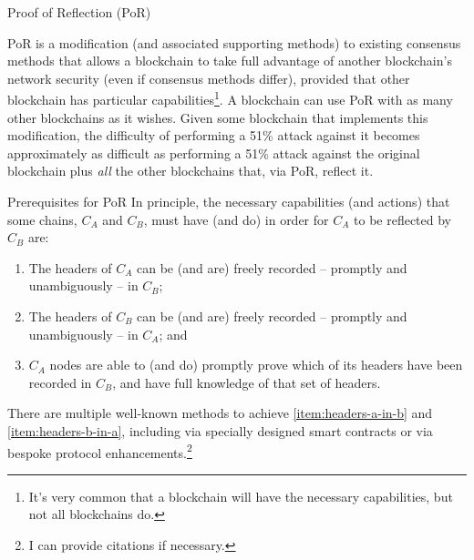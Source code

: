 \documentclass[a4paper,]{article}
\providecommand{\tightlist}{%
  \setlength{\itemsep}{0pt}\setlength{\parskip}{0pt}}
\begin{document}
\begin{section}{Proof of Reflection (PoR)}

    PoR is a modification (and associated supporting methods) to existing consensus methods that allows a blockchain to take full advantage of another blockchain's network security (even if consensus methods differ), provided that other blockchain has particular capabilities\footnote{It's very common that a blockchain will have the necessary capabilities, but not all blockchains do.}. A blockchain can use PoR with as many other blockchains as it wishes. Given some blockchain that implements this modification, the difficulty of performing a 51\% attack against it becomes approximately as difficult as performing a 51\% attack against the original blockchain plus \emph{all} the other blockchains that, via PoR, reflect it.

 \begin{subsection}{Prerequisites for PoR}
     In principle, the necessary capabilities (and actions) that some chains,
     \(C_A\) and \(C_B\), must have (and do) in order for \(C_A\) to be
     reflected by \(C_B\) are:

     \begin{enumerate}
         \def\labelenumi{\arabic{enumi}.}
         \tightlist
         \item \label{item:headers-a-in-b}
               The headers of \(C_A\) can be (and are) freely recorded -- promptly and unambiguously -- in \(C_B\);
         \item \label{item:headers-b-in-a}
               The headers of \(C_B\) can be (and are) freely recorded -- promptly and unambiguously -- in \(C_A\); and
         \item \label{item:prove-headers}
               \(C_A\) nodes are able to (and do) promptly prove which of its headers have been recorded in \(C_B\), and have full knowledge of that set of headers.
     \end{enumerate}

     There are multiple well-known methods to achieve \autoref{item:headers-a-in-b} and \autoref{item:headers-b-in-a}, including via specially designed smart contracts or via bespoke protocol enhancements.\footnote{I can provide citations if necessary.}


\end{subsection}
\end{section}
\end{document}
